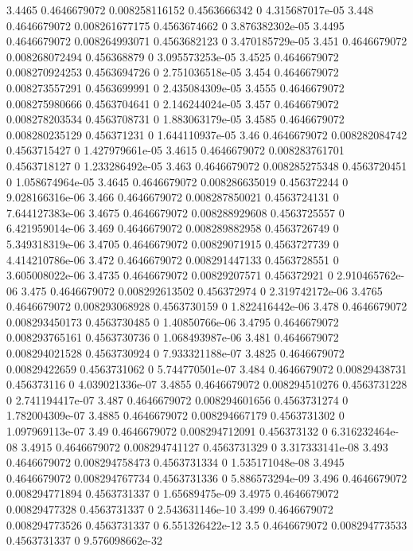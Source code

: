 {3.4465 0.4646679072 0.008258116152 0.4563666342 0 4.315687017e-05
3.448 0.4646679072 0.008261677175 0.4563674662 0 3.876382302e-05
3.4495 0.4646679072 0.008264993071 0.4563682123 0 3.470185729e-05
3.451 0.4646679072 0.008268072494 0.456368879 0 3.095573253e-05
3.4525 0.4646679072 0.008270924253 0.4563694726 0 2.751036518e-05
3.454 0.4646679072 0.008273557291 0.4563699991 0 2.435084309e-05
3.4555 0.4646679072 0.008275980666 0.4563704641 0 2.146244024e-05
3.457 0.4646679072 0.008278203534 0.4563708731 0 1.883063179e-05
3.4585 0.4646679072 0.008280235129 0.456371231 0 1.644110937e-05
3.46 0.4646679072 0.008282084742 0.4563715427 0 1.427979661e-05
3.4615 0.4646679072 0.008283761701 0.4563718127 0 1.233286492e-05
3.463 0.4646679072 0.008285275348 0.4563720451 0 1.058674964e-05
3.4645 0.4646679072 0.008286635019 0.456372244 0 9.028166316e-06
3.466 0.4646679072 0.008287850021 0.4563724131 0 7.644127383e-06
3.4675 0.4646679072 0.008288929608 0.4563725557 0 6.421959014e-06
3.469 0.4646679072 0.008289882958 0.4563726749 0 5.349318319e-06
3.4705 0.4646679072 0.00829071915 0.4563727739 0 4.414210786e-06
3.472 0.4646679072 0.008291447133 0.4563728551 0 3.605008022e-06
3.4735 0.4646679072 0.00829207571 0.456372921 0 2.910465762e-06
3.475 0.4646679072 0.008292613502 0.456372974 0 2.319742172e-06
3.4765 0.4646679072 0.008293068928 0.4563730159 0 1.822416442e-06
3.478 0.4646679072 0.008293450173 0.4563730485 0 1.40850766e-06
3.4795 0.4646679072 0.008293765161 0.4563730736 0 1.068493987e-06
3.481 0.4646679072 0.008294021528 0.4563730924 0 7.933321188e-07
3.4825 0.4646679072 0.00829422659 0.4563731062 0 5.744770501e-07
3.484 0.4646679072 0.00829438731 0.456373116 0 4.039021336e-07
3.4855 0.4646679072 0.008294510276 0.4563731228 0 2.741194417e-07
3.487 0.4646679072 0.008294601656 0.4563731274 0 1.782004309e-07
3.4885 0.4646679072 0.008294667179 0.4563731302 0 1.097969113e-07
3.49 0.4646679072 0.008294712091 0.456373132 0 6.316232464e-08
3.4915 0.4646679072 0.008294741127 0.4563731329 0 3.317333141e-08
3.493 0.4646679072 0.008294758473 0.4563731334 0 1.535171048e-08
3.4945 0.4646679072 0.008294767734 0.4563731336 0 5.886573294e-09
3.496 0.4646679072 0.008294771894 0.4563731337 0 1.65689475e-09
3.4975 0.4646679072 0.00829477328 0.4563731337 0 2.543631146e-10
3.499 0.4646679072 0.008294773526 0.4563731337 0 6.551326422e-12
3.5 0.4646679072 0.008294773533 0.4563731337 0 9.576098662e-32
}\chainhistory
{}\chainsweep
